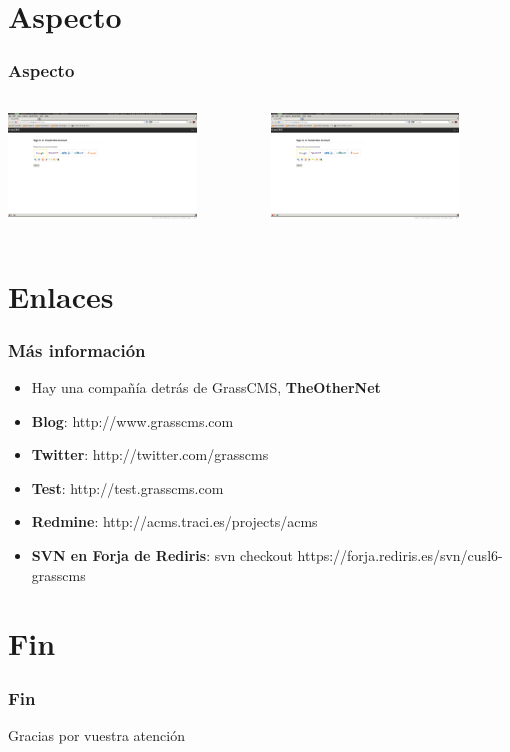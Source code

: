 \documentclass[utf8]{beamer}
\begin{document}
\section{Aspecto}
\begin{frame}
	\frametitle{Aspecto}
	\begin{columns}
		\begin{column}{5cm}
			\includegraphics[width=5cm]{images/aspecto1.png}
		\end{column}
		\begin{column}{5cm}
			\includegraphics[width=5cm]{images/aspecto1.png}
		\end{column}
	\end{columns}
\end{frame}

\section{Enlaces}
\begin{frame}
	\frametitle{Más información}
	\begin{itemize}
		\item<1->{Hay una compañía detrás de GrassCMS, \textbf{TheOtherNet}}
		\item<2->{\textbf{Blog}: http://www.grasscms.com}
		\item<3->{\textbf{Twitter}: http://twitter.com/grasscms }
		\item<4->{\textbf{Test}: http://test.grasscms.com}
		\item<5->{\textbf{Redmine}: http://acms.traci.es/projects/acms}
		\item<6->{\textbf{SVN en Forja de Rediris}: svn checkout https://forja.rediris.es/svn/cusl6-grasscms}
	\end{itemize}
\end{frame}

\section{Fin}
\begin{frame}
	\frametitle{Fin}
	\begin{center}
		\Huge
		Gracias por vuestra atención
	\end{center}
\end{frame}
\end{document}
